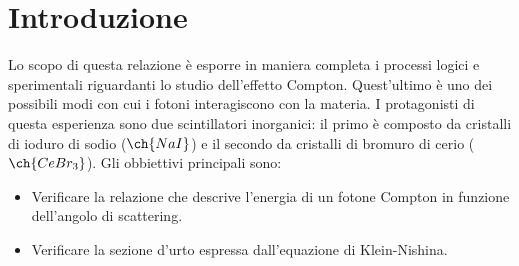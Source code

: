 \section{Introduzione}
Lo scopo di questa relazione è esporre in maniera completa i processi logici e sperimentali riguardanti lo studio dell'effetto Compton. Quest'ultimo è uno dei possibili modi con cui i fotoni interagiscono con la materia. I protagonisti di questa esperienza sono due scintillatori inorganici: il primo è composto da cristalli di ioduro di sodio ($\ch{NaI}$) e il secondo da cristalli di bromuro di cerio ($\ch{CeBr_3}$). Gli obbiettivi principali sono: 
\begin{itemize}
    \item Verificare la relazione che descrive l'energia di un fotone Compton in funzione dell'angolo di scattering.
    \item Verificare la sezione d'urto espressa dall'equazione di Klein-Nishina.
\end{itemize}
